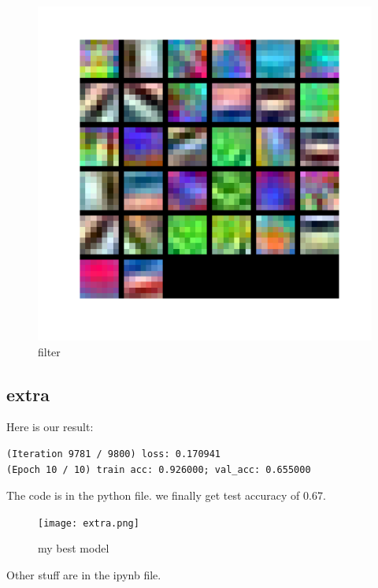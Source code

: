 \documentclass[12pt]{article}
\begin{document}
\begin{figure}[H]
  \caption{filter}
  \centering
    \includegraphics[scale=0.5]{filter.png}
\end{figure}

\subsection*{extra}
Here is our result:
\begin{lstlisting}
(Iteration 9781 / 9800) loss: 0.170941
(Epoch 10 / 10) train acc: 0.926000; val_acc: 0.655000
\end{lstlisting}
The code is in the python file.
we finally get test accuracy of 0.67.
\begin{figure}[H]
  \caption{my best model}
  \centering
    \texttt{[image: extra.png]}
\end{figure}
Other stuff are in the ipynb file.
\end{document}
